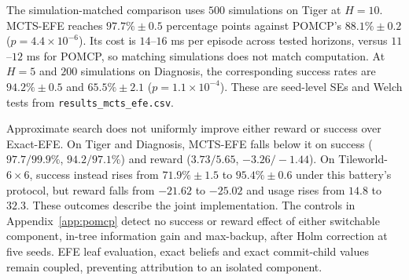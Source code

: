 The simulation-matched comparison uses $500$ simulations on Tiger at $H=10$. MCTS-EFE reaches $97.7\%\pm0.5$ percentage points against POMCP's $88.1\%\pm0.2$ ($p=4.4\times10^{-6}$). Its cost is $14$--$16$ ms per episode across tested horizons, versus $11$--$12$ ms for POMCP, so matching simulations does not match computation. At $H=5$ and $200$ simulations on Diagnosis, the corresponding success rates are $94.2\%\pm0.5$ and $65.5\%\pm2.1$ ($p=1.1\times10^{-4}$). These are seed-level SEs and Welch tests from \texttt{results\_\allowbreak mcts\_\allowbreak efe.csv}.

Approximate search does not uniformly improve either reward or success over Exact-EFE. On Tiger and Diagnosis, MCTS-EFE falls below it on success ($97.7/99.9\%$, $94.2/97.1\%$) and reward ($3.73/5.65$, $-3.26/-1.44$). On Tileworld-$6\times6$, success instead rises from $71.9\%\pm1.5$ to $95.4\%\pm0.6$ under this battery's protocol, but reward falls from $-21.62$ to $-25.02$ and usage rises from $14.8$ to $32.3$. These outcomes describe the joint implementation. The controls in Appendix~\ref{app:pomcp} detect no success or reward effect of either switchable component, in-tree information gain and max-backup, after Holm correction at five seeds. EFE leaf evaluation, exact beliefs and exact commit-child values remain coupled, preventing attribution to an isolated component.


